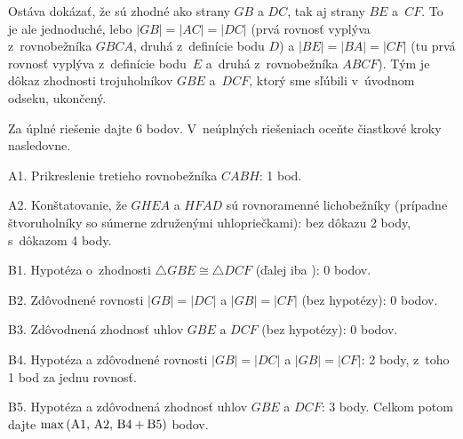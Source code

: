 {Ostáva dokázať, že sú zhodné ako strany $GB$ a $DC$, tak
aj strany $BE$ a~$CF$. To je ale jednoduché,
lebo $|GB|=|AC|=|DC|$ (prvá rovnosť vyplýva z~rovnobežníka $GBCA$,
druhá z~definície bodu $D$) a $|BE|=|BA|=|CF|$ (tu prvá rovnosť vyplýva z~definície bodu~$E$ a~druhá z~rovnobežníka $ABCF$). Tým je dôkaz zhodnosti trojuholníkov $GBE$ a~$DCF$, ktorý sme sľúbili v~úvodnom odseku, ukončený.


\schemaABC
Za úplné riešenie dajte 6 bodov. V~neúplných riešeniach oceňte
čiastkové kroky nasledovne.
\item{A1.} Prikreslenie tretieho rovnobežníka $CABH$: 1 bod.
\item{A2.} Konštatovanie, že $GHEA$ a $HFAD$ sú rovnoramenné lichobežníky (prípadne štvoruholníky so súmerne združenými uhlopriečkami): bez dôkazu 2 body, s~dôkazom 4 body.
\item{B1.} Hypotéza o~zhodnosti $\triangle GBE\cong\triangle DCF$ (ďalej iba ): 0 bodov.
\item{B2.} Zdôvodnené rovnosti $|GB|=|DC|$ a $|GB|=|CF|$ (bez hypotézy): 0 bodov.
\item{B3.} Zdôvodnená zhodnosť uhlov $GBE$ a $DCF$ (bez hypotézy): 0 bodov.
\item{B4.} Hypotéza a zdôvodnené rovnosti $|GB|=|DC|$ a $|GB|=|CF|$: 2 body, z~toho 1 bod za jednu rovnosť.
\item{B5.} Hypotéza a zdôvodnená zhodnosť uhlov $GBE$ a $DCF$: 3 body.
\endgraf\noindent
Celkom potom dajte $\rm\max\,(A1,\,A2,\,B4+B5)$ bodov.
\endschema
}


